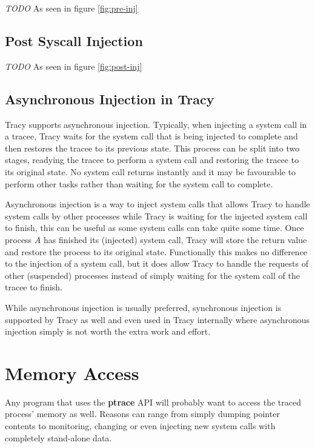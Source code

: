 \documentclass[a4paper, 10pt]{report}
\begin{document}
\textit{TODO}
As seen in figure \ref{fig:pre-inj}

\subsection{Post Syscall Injection}

\textit{TODO}
As seen in figure \ref{fig:post-inj}


\subsection{Asynchronous Injection in Tracy}

Tracy supports asynchronous injection. Typically, when injecting a system call
in a tracee, Tracy waits for the system call that is being injected to complete
and then restores the tracee to its previous state. This process can be split
into two stages, readying the tracee to perform a system call and restoring
the tracee to its original state. No system call returns instantly and it
may be favourable to perform other tasks rather than waiting for the system
call to complete.

Asynchronous injection is a way to inject system calls that allows Tracy to
handle system calls by other processes while Tracy is waiting for the
injected system call to finish, this can be useful as some system calls can take quite
some time.
Once process $A$ has finished its (injected) system call, Tracy will store
the return value and restore the process to its original state.
Functionally this makes no difference to the injection of a system call, but
it does allow Tracy to handle the requests of other (suspended) processes
instead of simply waiting for the system call of the tracee to finish.

While asynchronous injection is usually preferred, synchronous injection is
supported by Tracy as well and even used in Tracy internally where
asynchronous injection simply is not worth the extra work and effort.

\section{Memory Access}


Any program that uses the \textbf{ptrace} API will probably want to access the
traced process' memory as well. Reasons can range from simply dumping pointer
contents to monitoring, changing or even injecting new system calls with
completely stand-alone data.
\end{document}
